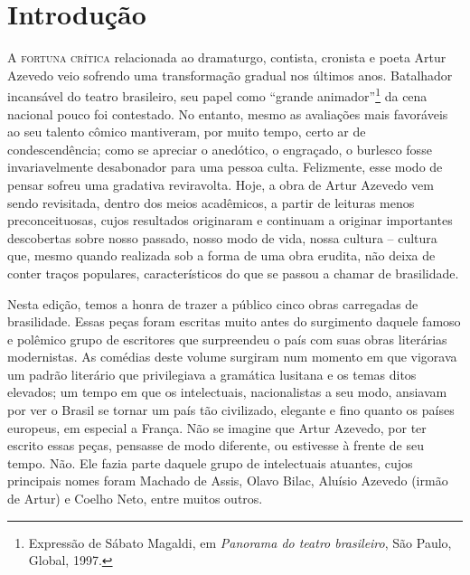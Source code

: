 \renewcommand{\fala}[1]{\noindent\quad\textsc{#1} --}

\chapter[Introdução, por Larissa de Oliveira Neves]{Introdução}

\textsc{A fortuna crítica} relacionada ao dramaturgo, contista, cronista e poeta
Artur Azevedo veio sofrendo uma transformação gradual nos últimos anos.
Batalhador incansável do teatro brasileiro, seu papel como “grande
animador”\footnote{ Expressão de Sábato Magaldi, em \textit{Panorama do teatro
brasileiro}, São Paulo, Global, 1997.} da cena nacional pouco foi contestado. No
entanto, mesmo as avaliações mais favoráveis ao seu talento cômico
mantiveram, por muito tempo, certo ar de condescendência; como se
apreciar o anedótico, o engraçado, o burlesco fosse invariavelmente
desabonador para uma pessoa culta. Felizmente, esse modo de pensar
sofreu uma gradativa reviravolta. Hoje, a obra de Artur Azevedo vem
sendo revisitada, dentro dos meios acadêmicos, a partir de leituras
menos preconceituosas, cujos resultados originaram e continuam a
originar importantes descobertas sobre nosso passado, nosso modo
de vida, nossa cultura -- cultura que, mesmo quando
realizada sob a forma de uma obra erudita, não deixa de conter traços
populares, característicos do que se passou a chamar de brasilidade.

Nesta edição, temos a honra de trazer a público cinco obras carregadas
de brasilidade. Essas peças foram escritas muito antes do surgimento
daquele famoso e polêmico grupo de escritores que surpreendeu o país
com suas obras literárias modernistas. As comédias deste volume
surgiram num momento em que vigorava um padrão literário que
privilegiava a gramática lusitana e os temas ditos elevados; um tempo em
que os intelectuais, nacionalistas a seu modo, ansiavam por ver o
Brasil se tornar um país tão civilizado, elegante e fino quanto os
países europeus, em especial a França. Não se imagine que Artur
Azevedo, por ter escrito essas peças, pensasse de modo diferente, ou
estivesse à frente de seu tempo. Não. Ele fazia parte daquele grupo de
intelectuais atuantes, cujos principais nomes foram Machado de Assis,
Olavo Bilac, Aluísio Azevedo (irmão de Artur) e Coelho Neto, entre
muitos outros. 

